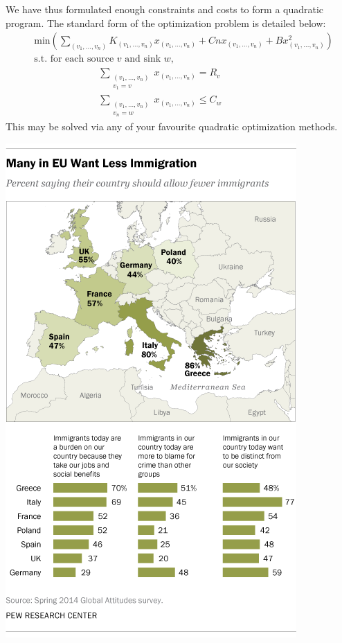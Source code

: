 \documentclass{article}
\begin{document}
We have thus formulated enough constraints and costs to form a quadratic program.  The standard form of the optimization problem is detailed below:
%
\begin{align*}
    &\text{min} \left( \sum_{(v_1, \dots, v_n)} K_{(v_1, \dots, v_n)} x_{(v_1, \dots, v_n)} + Cn x_{(v_1, \dots, v_n)} + B x_{(v_1, \dots, v_n)}^2 \right)\\
    &\text{s.t. for each source $v$ and sink $w$,}\\
    &\ \ \ \ \ \ \ \ \ \ \ \ \ \ \ \ \ \ \ \ \ \ \ \ \ \ \ \ \ \ \sum_{\substack{(v_1, \dots, v_n) \\ v_1 = v}} x_{(v_1, \dots, v_n)} = R_v\\
    &\ \ \ \ \ \ \ \ \ \ \ \ \ \ \ \ \ \ \ \ \ \ \ \ \ \ \ \ \ \ \sum_{\substack{(v_1, \dots, v_n) \\ v_n = w}} x_{(v_1, \dots, v_n)} \leq C_w
\end{align*}
%
This may be solved via any of your favourite quadratic optimization methods.

\begin{center}
\includegraphics[scale=0.5]{ImmigrationPoll}
\end{center}
\end{document}

